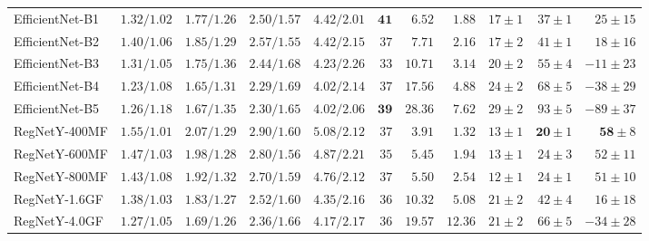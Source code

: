 \begin{table}
\begin{adjustbox}{angle=90, max height=0.85\textheight}
\begin{tabular}{lrrrrrrrrrr}
        EfficientNet-B1 & $1.32/\mathbf{1.02}$ & $ 1.77/\mathbf{1.26}$ & $ 2.50/1.57         $ & $  4.42/\mathbf{2.01}         $ & $  \mathbf{41}$ & $ 6.52$ & $ 1.88$ & $17          \pm 1$ & $37          \pm 1$ & $  25          \pm 15$ \\
        EfficientNet-B2 & $1.40/1.06         $ & $ 1.85/1.29         $ & $ 2.57/1.55         $ & $  4.42/2.15                  $ & $  37         $ & $ 7.71$ & $ 2.16$ & $17          \pm 2$ & $41          \pm 1$ & $  18          \pm 16$ \\
        EfficientNet-B3 & $1.31/1.05         $ & $ 1.75/1.36         $ & $ 2.44/1.68         $ & $  4.23/2.26                  $ & $  33         $ & $10.71$ & $ 3.14$ & $20          \pm 2$ & $55          \pm 4$ & $- 11          \pm 23$ \\
        EfficientNet-B4 & $\mathbf{1.23}/1.08$ & $ \mathbf{1.65}/1.31$ & $ \mathbf{2.29}/1.69$ & $  \mathbf{4.02}/2.14         $ & $  37         $ & $17.56$ & $ 4.88$ & $24          \pm 2$ & $68          \pm 5$ & $- 38          \pm 29$ \\
        EfficientNet-B5 & $1.26/1.18         $ & $ 1.67/1.35         $ & $ \mathbf{2.30}/1.65$ & $  \mathbf{4.02}/\mathbf{2.06}$ & $  \mathbf{39}$ & $28.36$ & $ 7.62$ & $29          \pm 2$ & $93          \pm 5$ & $- 89          \pm 37$ \\
        RegNetY-400MF   & $1.55/\mathbf{1.01}$ & $ 2.07/1.29         $ & $ 2.90/1.60         $ & $  5.08/2.12                  $ & $  37         $ & $ 3.91$ & $ 1.32$ & $13          \pm 1$ & $\mathbf{20} \pm 1$ & $  \mathbf{58} \pm  8$ \\
        RegNetY-600MF   & $1.47/1.03         $ & $ 1.98/1.28         $ & $ 2.80/1.56         $ & $  4.87/2.21                  $ & $  35         $ & $ 5.45$ & $ 1.94$ & $13          \pm 1$ & $24          \pm 3$ & $  52          \pm 11$ \\
        RegNetY-800MF   & $1.43/1.08         $ & $ 1.92/1.32         $ & $ 2.70/1.59         $ & $  4.76/2.12                  $ & $  37         $ & $ 5.50$ & $ 2.54$ & $12          \pm 1$ & $24          \pm 1$ & $  51          \pm 10$ \\
        RegNetY-1.6GF   & $1.38/1.03         $ & $ 1.83/1.27         $ & $ 2.52/1.60         $ & $  4.35/2.16                  $ & $  36         $ & $10.32$ & $ 5.08$ & $21          \pm 2$ & $42          \pm 4$ & $  16          \pm 18$ \\
        RegNetY-4.0GF   & $1.27/1.05         $ & $ 1.69/\mathbf{1.26}$ & $ 2.36/1.66         $ & $  4.17/2.17                  $ & $  36         $ & $19.57$ & $12.36$ & $21          \pm 2$ & $66          \pm 5$ & $- 34          \pm 28$ \\

\end{tabular}
\end{adjustbox}
\end{table}
